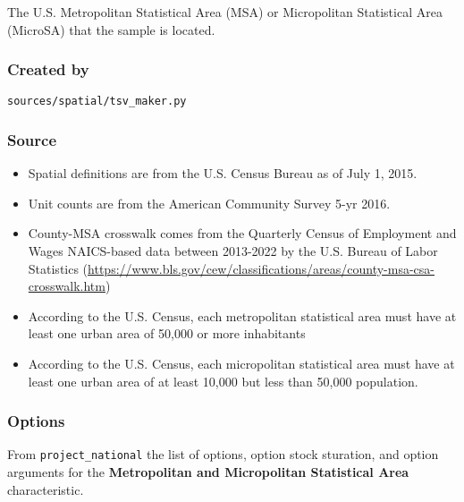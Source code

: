 The U.S. Metropolitan Statistical Area (MSA) or Micropolitan Statistical
Area (MicroSA) that the sample is located.

\subsubsection{Created by}\label{created-by-110}

\texttt{sources/spatial/tsv\_maker.py}

\subsubsection{Source}\label{source-112}

\begin{itemize}
 
\item
  Spatial definitions are from the U.S. Census Bureau as of July 1,
  2015.
\item
  Unit counts are from the American Community Survey 5-yr 2016.
\item
  County-MSA crosswalk comes from the Quarterly Census of Employment and
  Wages NAICS-based data between 2013-2022 by the U.S. Bureau of Labor
  Statistics
  (\url{https://www.bls.gov/cew/classifications/areas/county-msa-csa-crosswalk.htm})
\item
  According to the U.S. Census, each metropolitan statistical area must
  have at least one urban area of 50,000 or more inhabitants
\item
  According to the U.S. Census, each micropolitan statistical area must
  have at least one urban area of at least 10,000 but less than 50,000
  population.
\end{itemize}

\subsubsection{Options}\label{options-113}

From \texttt{project\_national} the list of options, option stock
sturation, and option arguments for the \textbf{Metropolitan and
Micropolitan Statistical Area} characteristic.

